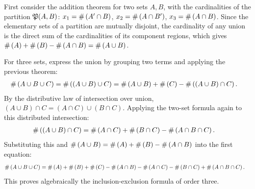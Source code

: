 \begin{solproblema}[prob:6d1bd44]
	First consider the addition theorem for two sets $A, B$, with the cardinalities of the partition $\mathfrak{P}(A,B)$: $x_1 = \#\left( A' \cap B \right)$, $x_2 = \#\left( A \cap B' \right)$, $x_3 = \#\left( A \cap B \right)$. Since the elementary sets of a partition are mutually disjoint, the cardinality of any union is the direct sum of the cardinalities of its component regions, which gives $\#\left( A \right) + \#\left( B \right) - \#\left( A \cap B \right) = \#\left( A \cup B \right)$.

	For three sets, express the union by grouping two terms and applying the previous theorem:
	\begin{align}
		\#\left( A \cup B \cup C \right) &= \#\left( (A \cup B) \cup C \right) = \#\left( A \cup B \right) + \#\left( C \right) - \#\left( (A \cup B) \cap C \right).
	\end{align}
	By the distributive law of intersection over union, $(A \cup B) \cap C = (A \cap C) \cup (B \cap C)$. Applying the two-set formula again to this distributed intersection:
	\begin{align}
		\#\left( (A \cup B) \cap C \right) &= \#\left( A \cap C \right) + \#\left( B \cap C \right) - \#\left( A \cap B \cap C \right).
	\end{align}
	Substituting this and $\#\left( A \cup B \right) = \#\left( A \right) + \#\left( B \right) - \#\left( A \cap B \right)$ into the first equation:
	\begin{align}
		\#\left( A \cup B \cup C \right) &= \#\left( A \right) + \#\left( B \right) + \#\left( C \right) - \#\left( A \cap B \right) - \#\left( A \cap C \right) - \#\left( B \cap C \right) + \#\left( A \cap B \cap C \right).
	\end{align}
	This proves algebraically the inclusion-exclusion formula of order three.
\end{solproblema}

